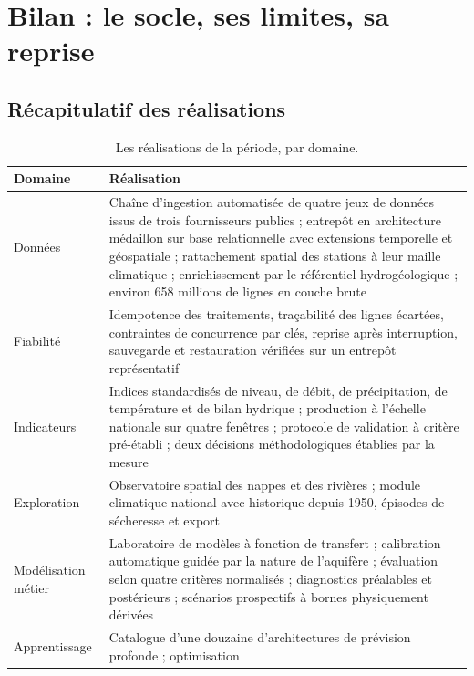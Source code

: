 \chapter{Bilan : le socle, ses limites, sa reprise}
\label{ch:bilan}


\section{Récapitulatif des réalisations}

\begin{table}[H]
\centering
\caption{Les réalisations de la période, par domaine.}
\label{tab:realisations}
\begin{tabularx}{\textwidth}{@{}L{3.4cm}Y@{}}
\toprule
\textbf{Domaine} & \textbf{Réalisation} \\
\midrule
Données & Chaîne d'ingestion automatisée de quatre jeux de données issus de trois fournisseurs
publics ; entrepôt en architecture médaillon sur base relationnelle avec extensions temporelle
et géospatiale ; rattachement spatial des stations à leur maille climatique ; enrichissement par
le référentiel hydrogéologique ; environ \num{658} millions de lignes en couche brute \\
Fiabilité & Idempotence des traitements, traçabilité des lignes écartées, contraintes de
concurrence par clés, reprise après interruption, sauvegarde et restauration vérifiées sur un
entrepôt représentatif \\
Indicateurs & Indices standardisés de niveau, de débit, de précipitation, de température et de
bilan hydrique ; production à l'échelle nationale sur quatre fenêtres ; protocole de validation
à critère pré-établi ; deux décisions méthodologiques établies par la mesure \\
Exploration & Observatoire spatial des nappes et des rivières ; module climatique national avec
historique depuis 1950, épisodes de sécheresse et export \\
Modélisation métier & Laboratoire de modèles à fonction de transfert ; calibration automatique
guidée par la nature de l'aquifère ; évaluation selon quatre critères normalisés ; diagnostics
préalables et postérieurs ; scénarios prospectifs à bornes physiquement dérivées \\
Apprentissage & Catalogue d'une douzaine d'architectures de prévision profonde ; optimisation

\end{tabularx}
\end{table}
